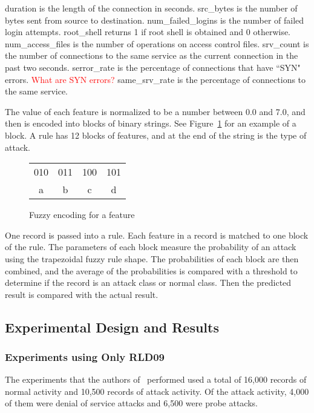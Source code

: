 \documentclass{sig-alternate}
\newcommand{\mycomment}[1]{\textcolor{red}{#1}}
\begin{document}
duration is the length of the connection in seconds. src\_bytes is the number of bytes sent from source to destination. num\_failed\_logins is the number of failed login attempts. root\_shell returns 1 if root shell is obtained and 0 otherwise. num\_access\_files is the number of operations on access control files. srv\_count is the number of connections to the same service as the current connection in the past two seconds. serror\_rate is the percentage of connections that have ``SYN" errors.
\mycomment{What are SYN errors?}
 same\_srv\_rate is the percentage of connections to the same service.~\cite{KDD99Features}


The value of each feature is normalized to be a number between 0.0 and 7.0, and then is encoded into blocks of binary strings. See Figure~\ref{fig:fuzEncodingForFeature} for an example of a block. A rule has 12 blocks of features, and at the end of the string is the type of attack. 

\begin{figure}
\centering
\caption{Fuzzy encoding for a feature}
\begin{tabular}{|c|c|c|c|} \hline
010 & 011 & 100 & 101\\
a & b & c & d\\
\hline\end{tabular}
\label{fig:fuzEncodingForFeature}
\end{figure}

One record is passed into a rule. Each feature in a record is matched to one block of the rule. The parameters of each block measure the probability of an attack using the trapezoidal fuzzy rule shape. The probabilities of each block are then combined, and the average of the probabilities is compared with a threshold to determine if the record is an attack class or normal class. Then the predicted result is compared with the actual result.




\subsection{Experimental Design and Results}
\subsubsection{Experiments using Only RLD09}
The experiments that the authors of~\cite{6496342, 6559603} performed used a total of 16,000 records of normal activity and 10,500 records of attack activity. Of the attack activity, 4,000 of them were denial of service attacks and 6,500 were probe attacks.
\end{document}
